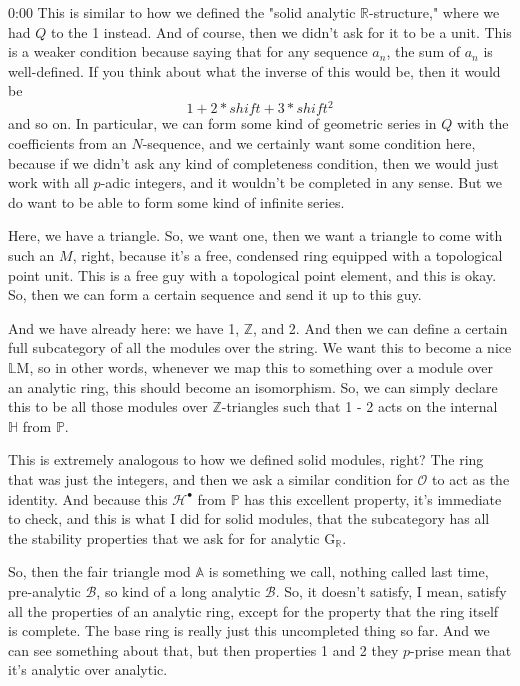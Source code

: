 \begin{unfinished}{0:00}
This is similar to how we defined the "solid analytic $\mathbb{R}$-structure," where we had $Q$ to the 1 instead. And of course, then we didn't ask for it to be a unit. This is a weaker condition because saying that for any sequence $a_n$, the sum of $a_n$ is well-defined. If you think about what the inverse of this would be, then it would be
\[ 1 + 2 * shift + 3 * shift^2 \]
and so on. In particular, we can form some kind of geometric series in $Q$ with the coefficients from an $N$-sequence, and we certainly want some condition here, because if we didn't ask any kind of completeness condition, then we would just work with all $p$-adic integers, and it wouldn't be completed in any sense. But we do want to be able to form some kind of infinite series.

Here, we have a triangle. So, we want one, then we want a triangle to come with such an $M$, right, because it's a free, condensed ring equipped with a topological point unit. This is a free guy with a topological point element, and this is okay. So, then we can form a certain sequence and send it up to this guy.

And we have already here: we have 1, $\mathbb{Z}$, and 2. And then we can define a certain full subcategory of all the modules over the string. We want this to become a nice $\mathbb{L}$M, so in other words, whenever we map this to something over a module over an analytic ring, this should become an isomorphism. So, we can simply declare this to be all those modules over $\mathbb{Z}$-triangles such that 1 - 2 acts on the internal $\mathbb{H}$ from $\mathbb{P}$.

This is extremely analogous to how we defined solid modules, right? The ring that was just the integers, and then we ask a similar condition for $\mathcal{O}$ to act as the identity. And because this $\mathcal{H}^{\bullet}$ from $\mathbb{P}$ has this excellent property, it's immediate to check, and this is what I did for solid modules, that the subcategory has all the stability properties that we ask for for analytic $\mathrm{G}_{\mathbb{R}}$.

So, then the fair triangle mod $\mathbb{A}$ is something we call, nothing called last time, pre-analytic $\mathscr{B}$, so kind of a long analytic $\mathscr{B}$. So, it doesn't satisfy, I mean, satisfy all the properties of an analytic ring, except for the property that the ring itself is complete. The base ring is really just this uncompleted thing so far. And we can see something about that, but then properties 1 and 2 they $p$-prise mean that it's analytic over analytic.


\end{unfinished}
